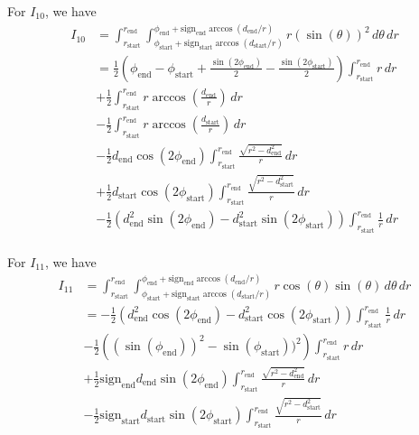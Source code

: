 \documentclass{article}
\numberwithin{equation}{section}
\begin{document}
For $I_{10}$, we have 
\begin{equation}
\begin{split}
    I_{10} & = \int_{r_\mathrm{start}}^{r_\mathrm{end}} \int_{\phi_\mathrm{start} + \mathrm{sign}_\mathrm{start}\arccos\left(d_\mathrm{start}/r\right)}^{\phi_\mathrm{end} + \mathrm{sign}_\mathrm{end}\arccos\left(d_\mathrm{end}/r\right)} r(\sin(\theta))^2 \, d\theta \, dr \\
    & = \frac{1}{2}(\phi_\mathrm{end} - \phi_\mathrm{start} + \frac{\sin(2\phi_\mathrm{end})}{2} - \frac{\sin(2\phi_\mathrm{start})}{2}) \int_{r_\mathrm{start}}^{r_\mathrm{end}} r \, dr \\
    & + \frac{1}{2}\int_{r_\mathrm{start}}^{r_\mathrm{end}} r\arccos\left(\frac{d_\mathrm{end}}{r}\right)\, dr \\ 
    & - \frac{1}{2}\int_{r_\mathrm{start}}^{r_\mathrm{end}} r\arccos\left(\frac{d_\mathrm{start}}{r}\right)\, dr \\ 
    & - \frac{1}{2}d_\mathrm{end}\cos(2\phi_\mathrm{end}) \int_{r_\mathrm{start}}^{r_\mathrm{end}} \frac{\sqrt{r^2-d_\mathrm{end}^2}}{r}\, dr \\
    & + \frac{1}{2}d_\mathrm{start}\cos(2\phi_\mathrm{start}) \int_{r_\mathrm{start}}^{r_\mathrm{end}} \frac{\sqrt{r^2-d_\mathrm{start}^2}}{r}\, dr \\
    & - \frac{1}{2}(d_\mathrm{end}^2\sin(2\phi_\mathrm{end}) - d_\mathrm{start}^2\sin(2\phi_\mathrm{start})) \int_{r_\mathrm{start}}^{r_\mathrm{end}} \frac{1}{r} \, dr \\ 
\end{split}
\end{equation}

For $I_{11}$, we have 
\begin{equation}
\begin{split}
    I_{11}  & = \int_{r_\mathrm{start}}^{r_\mathrm{end}} \int_{\phi_\mathrm{start} + \mathrm{sign}_\mathrm{start}\arccos\left(d_\mathrm{start}/r\right)}^{\phi_\mathrm{end} + \mathrm{sign}_\mathrm{end}\arccos\left(d_\mathrm{end}/r\right)} r\cos(\theta)\sin(\theta) \, d\theta \, dr \\
    & = -\frac{1}{2} (d_\mathrm{end}^2 \cos(2\phi_\mathrm{end}) - d_\mathrm{start}^2 \cos(2\phi_\mathrm{start})) \int_{r_\mathrm{start}}^{r_\mathrm{end}} \frac{1}{r}\, dr \\
    & - \frac{1}{2}\left((\sin(\phi_\mathrm{end}))^2 - \sin(\phi_\mathrm{start}))^2\right)\int_{r_\mathrm{start}}^{r_\mathrm{end}} r\, dr \\
    & + \frac{1}{2}\mathrm{sign}_\mathrm{end} d_\mathrm{end}\sin(2\phi_\mathrm{end}) \int_{r_\mathrm{start}}^{r_\mathrm{end}} \frac{\sqrt{r^2 - d_\mathrm{end}^2}}{r}\, dr \\
    & - \frac{1}{2}\mathrm{sign}_\mathrm{start} d_\mathrm{start}\sin(2\phi_\mathrm{start}) \int_{r_\mathrm{start}}^{r_\mathrm{end}} \frac{\sqrt{r^2 - d_\mathrm{start}^2}}{r}\, dr \\
\end{split}
\end{equation}
\end{document}
